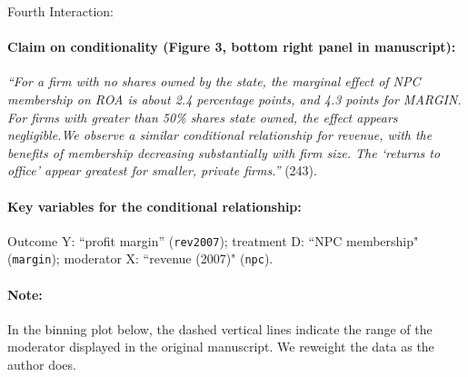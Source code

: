 \documentclass[12pt]{article}
\begin{document}
\clearpage


\noindent Fourth Interaction:

\paragraph{Claim on conditionality (Figure 3, bottom right panel in manuscript):} \emph{``For a firm with no shares owned by the state, the marginal effect of NPC membership on ROA is about 2.4 percentage points, and 4.3 points for MARGIN. For firms with greater than 50\% shares state owned, the effect appears negligible.We observe a similar conditional relationship for revenue, with the benefits of membership decreasing substantially with firm size. The `returns to office' appear greatest for smaller, private firms.''} (243). 

\paragraph{Key variables for the conditional relationship:} Outcome Y:
``profit margin'' (\texttt{rev2007}); treatment D: ``NPC membership" (\texttt{margin}); moderator X: ``revenue (2007)"
(\texttt{npc}).

\paragraph{Note:} In the binning plot below, the dashed vertical lines
indicate the range of the moderator displayed in the original
manuscript. We reweight the data as the author does.


\newpage
\end{document}
